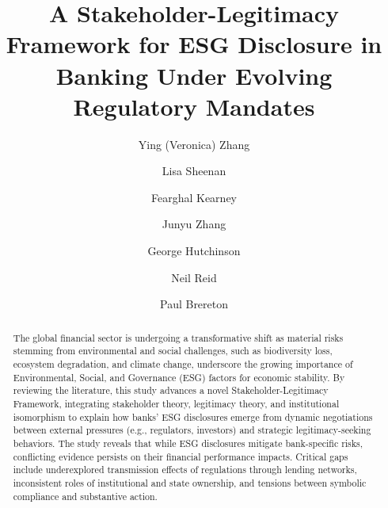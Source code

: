\documentclass[
  authoryear]{elsarticle}
\begin{document}
\begin{frontmatter}
\title{A Stakeholder-Legitimacy Framework for ESG Disclosure in Banking
Under Evolving Regulatory Mandates}

\author[1]{Ying (Veronica) Zhang%
%
}
\author[1,2]{Lisa Sheenan%
%
}

\author[3]{Fearghal Kearney%
%
}

\author[1]{Junyu Zhang%
%
}

\author[1]{George Hutchinson%
%
}

\author[1,3,4]{Neil Reid%
%
}

\author[1]{Paul Brereton%
%
}








        
\begin{abstract}
The global financial sector is undergoing a transformative shift as
\hspace{0pt}material risks stemming from environmental and social
challenges, such as\hspace{0pt} biodiversity loss, ecosystem
degradation, \hspace{0pt}and climate change,\hspace{0pt}\hspace{0pt}
underscore the growing importance of Environmental, Social, and
Governance (ESG) factors for economic stability. By reviewing the
literature, this study advances a novel Stakeholder-Legitimacy
Framework, integrating stakeholder theory, legitimacy theory, and
institutional isomorphism to explain how banks' ESG disclosures emerge
from dynamic negotiations between external pressures (e.g., regulators,
investors) and strategic legitimacy-seeking behaviors. The study reveals
that while ESG disclosures mitigate bank-specific risks, conflicting
evidence persists on their financial performance impacts. Critical gaps
include underexplored transmission effects of regulations through
lending networks, inconsistent roles of institutional and state
ownership, and tensions between symbolic compliance and substantive
action.
\end{abstract}






\end{frontmatter}
\end{document}
